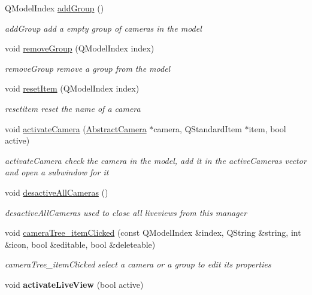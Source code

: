\begin{DoxyCompactItemize}
\item 
Q\-Model\-Index \hyperlink{class_abstract_camera_manager_a4eaaf63434076e5d53d19a44f434bec9}{add\-Group} ()
\begin{DoxyCompactList}\small\item\em add\-Group add a empty group of cameras in the model \end{DoxyCompactList}\item 
void \hyperlink{class_abstract_camera_manager_a5eea7f4d2ab3ea314020b405550b378c}{remove\-Group} (Q\-Model\-Index index)
\begin{DoxyCompactList}\small\item\em remove\-Group remove a group from the model \end{DoxyCompactList}\item 
void \hyperlink{class_abstract_camera_manager_a89cd0d1f9bb47d4abda51ea4f1e08f49}{reset\-Item} (Q\-Model\-Index index)
\begin{DoxyCompactList}\small\item\em resetitem reset the name of a camera \end{DoxyCompactList}\item 
void \hyperlink{class_abstract_camera_manager_aeafa7b5e2b0eb5bbc105fe6a0ee5e2f2}{activate\-Camera} (\hyperlink{class_abstract_camera}{Abstract\-Camera} $\ast$camera, Q\-Standard\-Item $\ast$item, bool active)
\begin{DoxyCompactList}\small\item\em activate\-Camera check the camera in the model, add it in the active\-Cameras vector and open a subwindow for it \end{DoxyCompactList}\item 
\hypertarget{class_abstract_camera_manager_a92ed218ecaab3f6a75d3d24e5544d17f}{void \hyperlink{class_abstract_camera_manager_a92ed218ecaab3f6a75d3d24e5544d17f}{desactive\-All\-Cameras} ()}\label{class_abstract_camera_manager_a92ed218ecaab3f6a75d3d24e5544d17f}

\begin{DoxyCompactList}\small\item\em desactive\-All\-Cameras used to close all liveviews from this manager \end{DoxyCompactList}\item 
void \hyperlink{class_abstract_camera_manager_a10dee0f2e9a5efa1cf8b5775df66fb19}{camera\-Tree\-\_\-item\-Clicked} (const Q\-Model\-Index \&index, Q\-String \&string, int \&icon, bool \&editable, bool \&deleteable)
\begin{DoxyCompactList}\small\item\em camera\-Tree\-\_\-item\-Clicked select a camera or a group to edit its properties \end{DoxyCompactList}\item 
\hypertarget{class_abstract_camera_manager_a01cbc0e517b10e8b1c087138307ab676}{void {\bfseries activate\-Live\-View} (bool active)}\label{class_abstract_camera_manager_a01cbc0e517b10e8b1c087138307ab676}


\end{DoxyCompactItemize}

